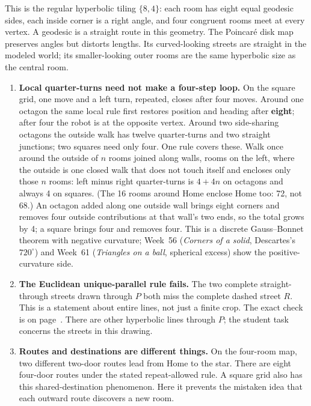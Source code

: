 \documentclass[11pt]{article}
\newcommand{\topic}[1]{\vspace{4pt}{\large\bfseries #1}\par}
\begin{document}
\topic{The mathematics first}
This is the regular hyperbolic tiling \(\{8,4\}\): each room has eight equal geodesic sides, each inside corner is a right angle, and four congruent rooms meet at every vertex. A geodesic is a straight route in this geometry. The Poincar\'e disk map preserves angles but distorts lengths. Its curved-looking streets are straight in the modeled world; its smaller-looking outer rooms are the same hyperbolic size as the central room.

\begin{enumerate}
\item \textbf{Local quarter-turns need not make a four-step loop.} On the square grid, one move and a left turn, repeated, closes after four moves. Around one octagon the same local rule first restores position and heading after \textbf{eight}; after four the robot is at the opposite vertex. Around two side-sharing octagons the outside walk has twelve quarter-turns and two straight junctions; two squares need only four. One rule covers these. Walk once around the outside of \(n\) rooms joined along walls, rooms on the left, where the outside is one closed walk that does not touch itself and encloses only those \(n\) rooms: left minus right quarter-turns is \(4+4n\) on octagons and always 4 on squares. (The 16 rooms around Home enclose Home too: 72, not 68.) An octagon added along one outside wall brings eight corners and removes four outside contributions at that wall's two ends, so the total grows by 4; a square brings four and removes four. This is a discrete Gauss--Bonnet theorem with negative curvature; Week~56 (\emph{Corners of a solid}, Descartes's \(720^\circ\)) and Week~61 (\emph{Triangles on a ball}, spherical excess) show the positive-curvature side.
\item \textbf{The Euclidean unique-parallel rule fails.} The two complete straight-through streets drawn through \(P\) both miss the complete dashed street \(R\). This is a statement about entire lines, not just a finite crop. The exact check is on page~\pageref{complete-proof}. There are other hyperbolic lines through \(P\); the student task concerns the streets in this drawing.
\item \textbf{Routes and destinations are different things.} On the four-room map, two different two-door routes lead from Home to the star. There are eight four-door routes under the stated repeat-allowed rule. A square grid also has this shared-destination phenomenon. Here it prevents the mistaken idea that each outward route discovers a new room.
\end{enumerate}
\end{document}
